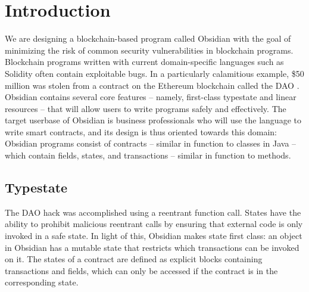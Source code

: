 \documentclass[sigplan,10pt,review]{acmart}\settopmatter{printfolios=true}
\begin{document}
\section{Introduction}


We are designing a blockchain-based program called Obsidian \cite{Coblenz} with the goal of 
minimizing the risk of common security vulnerabilities in blockchain programs. Blockchain
programs written with current domain-specific languages such as Solidity \cite{Solidity} often contain
exploitable bugs. In a particularly calamitious example, \$50 million was stolen from a contract on the 
Ethereum blockchain called the DAO \cite{Sirer}. Obsidian contains several core features
 -- namely, first-class typestate and linear resources -- that will allow users 
to write programs safely and effectively. The target 
userbase of Obsidian is business professionals who will use the language to write smart contracts, 
and its design is thus oriented towards this domain: Obsidian programs consist of contracts --
similar in function to classes in Java -- which contain fields, states, and transactions -- similar in
function to methods.

\subsection{Typestate}

The DAO hack was accomplished using a reentrant function call. States have the ability to 
prohibit malicious reentrant calls by ensuring that external code is only invoked in a safe state. 
In light of this, Obsidian makes state first class: an object in Obsidian has a mutable state that restricts which 
transactions can be invoked on it. The states of a contract are defined as explicit blocks containing 
transactions and fields, which can only be accessed if the contract is in the corresponding state. 
\end{document}
